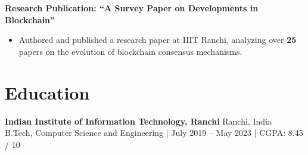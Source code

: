 \documentclass[8pt,a4paper]{extarticle}
\newcommand{\role}[2]{%
  \noindent\textbf{#1} \hfill #2\\[1pt]
}
\begin{document}
\textbf{Research Publication: ``A Survey Paper on Developments in Blockchain''}
\begin{itemize}
  \item Authored and published a research paper at IIIT Ranchi, analyzing over \textbf{25} papers on the evolution of blockchain consensus mechanisms.
\end{itemize}

\section*{Education}
\role{Indian Institute of Information Technology, Ranchi}{Ranchi, India}
B.Tech, Computer Science and Engineering | July 2019 -- May 2023 | CGPA: 8.45 / 10
\end{document}
